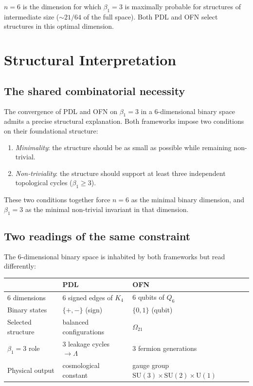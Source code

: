 \documentclass[11pt,a4paper]{article}
\begin{document}
$n = 6$ is the dimension for which $\beta_1 = 3$ is maximally probable for structures of intermediate size ($\sim 21/64$ of the full space). Both PDL and OFN select structures in this optimal dimension.

\section{Structural Interpretation}
\label{sec:interpretation}

\subsection{The shared combinatorial necessity}

The convergence of PDL and OFN on $\beta_1 = 3$ in a 6-dimensional binary space admits a precise structural explanation. Both frameworks impose two conditions on their foundational structure:
\begin{enumerate}
\item \emph{Minimality}: the structure should be as small as possible while remaining non-trivial.
\item \emph{Non-triviality}: the structure should support at least three independent topological cycles ($\beta_1 \geq 3$).
\end{enumerate}
These two conditions together force $n = 6$ as the minimal binary dimension, and $\beta_1 = 3$ as the minimal non-trivial invariant in that dimension.

\subsection{Two readings of the same constraint}

The 6-dimensional binary space is inhabited by both frameworks but read differently:

\begin{center}
\begin{tabular}{lll}
\toprule
 & PDL & OFN \\
\midrule
6 dimensions & 6 signed edges of $K_4$ & 6 qubits of $Q_6$ \\
Binary states & $\{+,-\}$ (sign) & $\{0,1\}$ (qubit) \\
Selected structure & balanced configurations & $\Omega_{21}$ \\
$\beta_1 = 3$ role & 3 leakage cycles $\to \Lambda$ & 3 fermion generations \\
Physical output & cosmological constant & gauge group $\mathrm{SU}(3)\times\mathrm{SU}(2)\times\mathrm{U}(1)$ \\
\bottomrule
\end{tabular}
\end{center}
\end{document}
